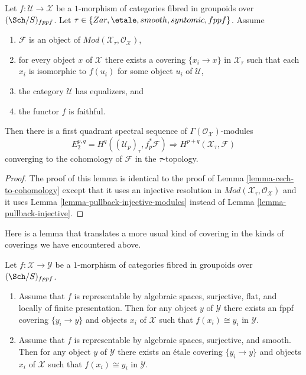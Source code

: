 \begin{lemma}
\label{lemma-cech-to-cohomology-modules}
Let $f : \mathcal{U} \to \mathcal{X}$ be a $1$-morphism of categories fibred
in groupoids over $(\Sch/S)_{fppf}$. Let
$\tau \in \{Zar, \etale, smooth, syntomic, fppf\}$.
Assume
\begin{enumerate}
\item $\mathcal{F}$ is an object of
$\textit{Mod}(\mathcal{X}_\tau, \mathcal{O}_\mathcal{X})$,
\item for every object $x$ of $\mathcal{X}$ there exists a covering
$\{x_i \to x\}$ in $\mathcal{X}_\tau$ such that each $x_i$ is isomorphic
to $f(u_i)$ for some object $u_i$ of $\mathcal{U}$,
\item the category $\mathcal{U}$ has equalizers, and
\item the functor $f$ is faithful.
\end{enumerate}
Then there is a first quadrant spectral sequence of
$\Gamma(\mathcal{O}_\mathcal{X})$-modules
$$
E_2^{p, q} = H^q((\mathcal{U}_p)_\tau, f_p^*\mathcal{F})
\Rightarrow
H^{p + q}(\mathcal{X}_\tau, \mathcal{F})
$$
converging to the cohomology of $\mathcal{F}$ in the $\tau$-topology.
\end{lemma}

\begin{proof}
The proof of this lemma is identical to the proof of
Lemma \ref{lemma-cech-to-cohomology}
except that it uses an injective resolution in
$\textit{Mod}(\mathcal{X}_\tau, \mathcal{O}_\mathcal{X})$
and it uses
Lemma \ref{lemma-pullback-injective-modules}
instead of
Lemma \ref{lemma-pullback-injective}.
\end{proof}

\noindent
Here is a lemma that translates a more usual kind of covering in the
kinds of coverings we have encountered above.

\begin{lemma}
\label{lemma-surjective-flat-locally-finite-presentation}
Let $f : \mathcal{X} \to \mathcal{Y}$ be a $1$-morphism of
categories fibred in groupoids over $(\Sch/S)_{fppf}$.
\begin{enumerate}
\item Assume that $f$ is representable by algebraic spaces, surjective,
flat, and locally of finite presentation. Then for any object $y$ of
$\mathcal{Y}$ there exists an fppf covering $\{y_i \to y\}$ and objects
$x_i$ of $\mathcal{X}$ such that $f(x_i) \cong y_i$ in $\mathcal{Y}$.
\item Assume that $f$ is representable by algebraic spaces, surjective,
and smooth. Then for any object $y$ of
$\mathcal{Y}$ there exists an \'etale covering $\{y_i \to y\}$ and objects
$x_i$ of $\mathcal{X}$ such that $f(x_i) \cong y_i$ in $\mathcal{Y}$.
\end{enumerate}
\end{lemma}


